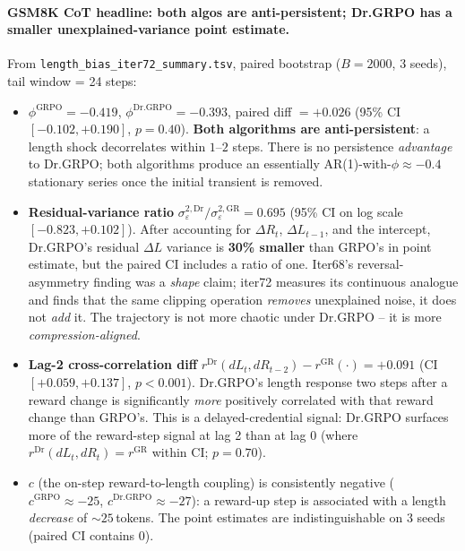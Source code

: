 \paragraph{GSM8K CoT headline: both algos are anti-persistent; Dr.GRPO has a smaller unexplained-variance point estimate.}
From \texttt{length\_bias\_iter72\_summary.tsv}, paired bootstrap
($B = 2000$, 3 seeds), tail window = 24 steps:
\begin{itemize}
\item $\phi^{\mathrm{GRPO}} = -0.419$, $\phi^{\mathrm{Dr.GRPO}} = -0.393$,
      paired diff $= +0.026$ (95\% CI $[-0.102, +0.190]$, $p = 0.40$).
      \textbf{Both algorithms are anti-persistent}: a length shock
      decorrelates within $1$--$2$ steps. There is no persistence
      \emph{advantage} to Dr.GRPO; both algorithms produce an
      essentially AR(1)-with-$\phi \approx -0.4$ stationary series once
      the initial transient is removed.
\item \textbf{Residual-variance ratio} $\sigma^{2,\mathrm{Dr}}_\varepsilon /
      \sigma^{2,\mathrm{GR}}_\varepsilon = 0.695$ (95\% CI on log scale
      $[-0.823, +0.102]$).
      After accounting for $\Delta R_t$, $\Delta L_{t-1}$, and the
      intercept, Dr.GRPO's residual $\Delta L$ variance is
      \textbf{30\% smaller} than GRPO's in point estimate, but the paired
      CI includes a ratio of one. Iter68's reversal-asymmetry
      finding was a \emph{shape} claim; iter72 measures its
      continuous analogue and finds that the same clipping operation
      \emph{removes} unexplained noise, it does not \emph{add} it. The
      trajectory is not more chaotic under Dr.GRPO -- it is more
      \emph{compression-aligned}.
\item \textbf{Lag-2 cross-correlation diff} $r^{\mathrm{Dr}}(dL_t,
      dR_{t-2}) - r^{\mathrm{GR}}(\cdot) = +0.091$ (CI $[+0.059,
      +0.137]$, $p < 0.001$). Dr.GRPO's length response two steps after
      a reward change is significantly \emph{more} positively correlated
      with that reward change than GRPO's. This is a delayed-credential
      signal: Dr.GRPO surfaces more of the reward-step signal at lag 2
      than at lag 0 (where $r^{\mathrm{Dr}}(dL_t, dR_t) = r^{\mathrm{GR}}$
      within CI; $p = 0.70$).
\item $c$ (the on-step reward-to-length coupling) is consistently
      negative ($c^{\mathrm{GRPO}} \approx -25$, $c^{\mathrm{Dr.GRPO}}
      \approx -27$): a reward-up step is associated with a length
      \emph{decrease} of $\sim 25$\,tokens. The point estimates are
      indistinguishable on 3 seeds (paired CI contains 0).
\end{itemize}

